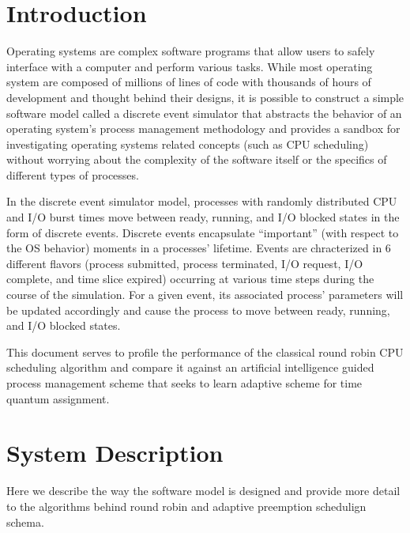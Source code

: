 \documentclass{article}
\begin{document}
\section*{Introduction}
Operating systems are complex software programs that allow users to safely interface with a computer
and perform various tasks. 
While most operating system are composed of millions of lines of code
with thousands of hours of development and thought behind their designs, 
it is possible to construct a simple software model called a discrete event simulator
that abstracts the behavior of an operating system's process management methodology 
and provides a sandbox for investigating operating systems related concepts (such as CPU scheduling) 
without worrying about the complexity of the software itself or the specifics of different types of processes.
\par
In the discrete event simulator model, processes with randomly distributed 
CPU and I/O burst times move between ready, running, and I/O blocked states in the form of discrete events. 
Discrete events encapsulate ``important'' (with respect to the OS behavior) moments
in a processes' lifetime. Events are chracterized in 6 different flavors 
(process submitted, process terminated, I/O request, I/O complete, and time slice expired) occurring at 
various time steps during the course of the simulation. 
For a given event, its associated process' parameters will be updated accordingly and 
cause the process to move between ready, running, and I/O blocked states.
\par
This document serves to profile the performance of the classical round robin CPU scheduling
algorithm and compare it against an artificial intelligence guided process management scheme
that seeks to learn adaptive scheme for time quantum assignment.
\section*{System Description}
Here we describe the way the software model is designed and provide more detail to the 
algorithms behind round robin and adaptive preemption schedulign schema.
\end{document}
